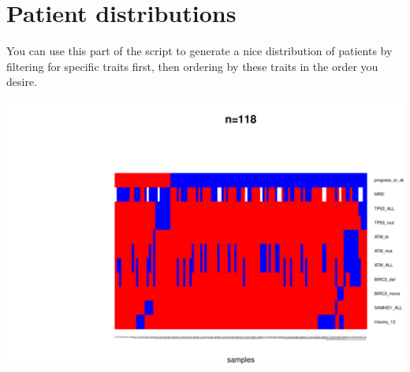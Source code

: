 \documentclass[a4paper,11pt]{article}
\begin{document}
\section{Patient distributions}
You can use this part of the script to generate a nice distribution of patients by filtering for specific traits first, then ordering by these traits in the order you desire.\\
\begin{center}
\includegraphics{HICF1_Finalreportv6-049}
\end{center}
\end{document}
